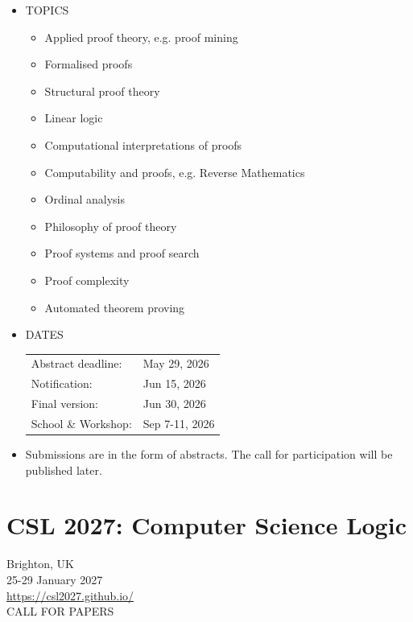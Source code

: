 \documentclass[prodmode,acmtecs]{acmsmall} %
\begin{document}
\begin{itemize}\item  TOPICS 
 
\begin{itemize}\item  Applied proof theory, e.g. proof mining
\item  Formalised proofs
\item  Structural proof theory
\item  Linear logic
\item  Computational interpretations of proofs
\item  Computability and proofs, e.g. Reverse Mathematics
\item  Ordinal analysis
\item  Philosophy of proof theory
\item  Proof systems and proof search
\item  Proof complexity
\item  Automated theorem proving
\end{itemize} 
\item  DATES 
 
\begin{tabulary}{\linewidth}{LL}Abstract deadline:  & May 29, 2026 \\
Notification:  & Jun 15, 2026 \\
Final version:  & Jun 30, 2026 \\
School \& Workshop:  & Sep 7-11, 2026 \\
\end{tabulary}
 
\item  Submissions are in the form of abstracts. The call for participation will be published later. 
 
\end{itemize}\section{CSL 2027: Computer Science Logic}\label{CSL2027}  Brighton, UK\\ 
  25-29 January 2027\\ 
  \href{https://csl2027.github.io/}{https://csl2027.github.io/}\\ 
CALL FOR PAPERS  
\end{document}
